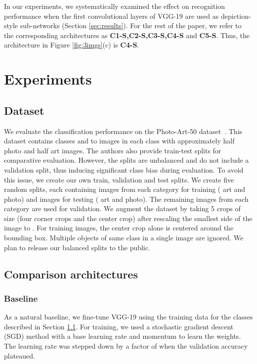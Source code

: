 \documentclass[preprint]{sig-alternate-05-2015}
\begin{document}
In our experiments, we systematically examined the effect on recognition performance when the first  convolutional layers of VGG-19 are used as depiction-style sub-networks  (Section \ref{sec:results}). For the rest of the paper, we refer to the corresponding architectures as \textbf{C1-S,C2-S,C3-S,C4-S} and \textbf{C5-S}. Thus, the architecture in Figure \ref{fig:3imgs}(c) is \textbf{C4-S}. 

\section{Experiments}
\label{sec:experiments}
 
\subsection{Dataset}
\label{datasets}
    We evaluate the classification performance on the Photo-Art-50 dataset~\cite{cai2015cross}. This dataset contains  classes and  to  images in each class with approximately half photo and half art images. The authors also provide train-test splits for comparative evaluation. However, the splits are unbalanced and do not include a validation split, thus inducing significant class bias during evaluation. To avoid this issue, we  create our own train, validation and test splits. We create five random splits, each containing  images from each category for training ( art and  photo) and  images for testing ( art and  photo). The remaining images from each category are used for validation. We augment the dataset by taking 5 crops of size  (four corner crops and the center crop) after rescaling the smallest side of the image to . For training images, the center crop alone is centered around the bounding box. Multiple objects of same class in a single image are ignored. We plan to release our balanced splits to the public.  

\subsection{Comparison architectures}
\label{sec:comparisonarch}

\subsubsection{Baseline}
\label{sec:baseline}
As a natural baseline, we fine-tune VGG-19 using the training data for the  classes described in Section \ref{datasets}. For training, we used a stochastic gradient descent (SGD) method with a base learning rate  and momentum  to learn the weights. The learning rate was stepped down by a factor of  when the validation accuracy plateaued.
\end{document}
